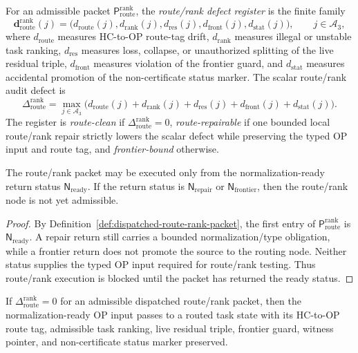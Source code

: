 \begin{definition}
\label{def:route-rank-defect-register}
For an admissible packet \(\mathsf P_{\mathrm{route}}^{\mathrm{rank}}\), the \emph{route/rank defect register} is the finite family
\[
 \mathbf d_{\mathrm{route}}^{\mathrm{rank}}(j)
 =
 \bigl(d_{\mathrm{route}}(j),d_{\mathrm{rank}}(j),d_{\mathrm{res}}(j),d_{\mathrm{front}}(j),d_{\mathrm{stat}}(j)\bigr),
 \qquad j\in\mathcal A_3,
\]
where \(d_{\mathrm{route}}\) measures HC-to-OP route-tag drift, \(d_{\mathrm{rank}}\) measures illegal or unstable task ranking, \(d_{\mathrm{res}}\) measures loss, collapse, or unauthorized splitting of the live residual triple, \(d_{\mathrm{front}}\) measures violation of the frontier guard, and \(d_{\mathrm{stat}}\) measures accidental promotion of the non-certificate status marker. The scalar route/rank audit defect is
\[
 \Delta_{\mathrm{route}}^{\mathrm{rank}}
 =
 \max_{j\in\mathcal A_3}
 \bigl(d_{\mathrm{route}}(j)+d_{\mathrm{rank}}(j)+d_{\mathrm{res}}(j)+d_{\mathrm{front}}(j)+d_{\mathrm{stat}}(j)\bigr).
\]
The register is \emph{route-clean} if \(\Delta_{\mathrm{route}}^{\mathrm{rank}}=0\), \emph{route-repairable} if one bounded local route/rank repair strictly lowers the scalar defect while preserving the typed OP input and route tag, and \emph{frontier-bound} otherwise.
\end{definition}

\begin{lemma}
\label{lem:normalization-ready-return-is-route-rank-precondition}
The route/rank packet may be executed only from the normalization-ready return status \(\mathsf N_{\mathrm{ready}}\). If the return status is \(\mathsf N_{\mathrm{repair}}\) or \(\mathsf N_{\mathrm{frontier}}\), then the route/rank node is not yet admissible.
\end{lemma}

\begin{proof}
By Definition~\ref{def:dispatched-route-rank-packet}, the first entry of \(\mathsf P_{\mathrm{route}}^{\mathrm{rank}}\) is \(\mathsf N_{\mathrm{ready}}\). A repair return still carries a bounded normalization/type obligation, while a frontier return does not promote the source to the routing node. Neither status supplies the typed OP input required for route/rank testing. Thus route/rank execution is blocked until the packet has returned the ready status.
\end{proof}

\begin{lemma}
\label{lem:zero-route-rank-defect-preserves-routed-op-task-data}
If \(\Delta_{\mathrm{route}}^{\mathrm{rank}}=0\) for an admissible dispatched route/rank packet, then the normalization-ready OP input passes to a routed task state with its HC-to-OP route tag, admissible task ranking, live residual triple, frontier guard, witness pointer, and non-certificate status marker preserved.
\end{lemma}

